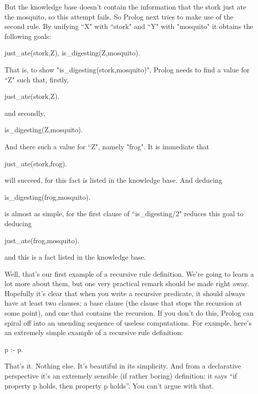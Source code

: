 But the knowledge base doesn't contain the information that the stork
just ate the mosquito, so this
attempt fails.  So Prolog next tries to make use of the second rule.
By unifying ``X" with ``stork" and ``Y" with
"mosquito" it obtains the following goals:
\begin{LPNcodedisplay}
just_ate(stork,Z),
is_digesting(Z,mosquito).
\end{LPNcodedisplay}
That is, to show
"is\_digesting(stork,mosquito)", Prolog
needs to find a value for ``Z" such that, firstly,
\begin{LPNcodedisplay}
just_ate(stork,Z).
\end{LPNcodedisplay}
and secondly,
\begin{LPNcodedisplay}
is_digesting(Z,mosquito).
\end{LPNcodedisplay}
And there  such a value for ``Z", namely
"frog".  It is immediate that
\begin{LPNcodedisplay}
just_ate(stork,frog).
\end{LPNcodedisplay}
will succeed, for this fact is listed in the knowledge base.  And deducing
\begin{LPNcodedisplay}
is_digesting(frog,mosquito).
\end{LPNcodedisplay}
is almost as simple, for the first clause of ``is\_digesting/2"
reduces this goal to deducing
\begin{LPNcodedisplay}
just_ate(frog,mosquito).
\end{LPNcodedisplay}
and this is a fact listed in the knowledge base.

Well, that's our first example of a recursive rule definition.  We're
going to learn a lot more about them, but one very practical remark
should be made right away.  Hopefully it's clear that when you write a
recursive predicate, it should always have at least two clauses: a
base clause (the clause that stops the recursion at some point), and
one that contains the recursion.  If you don't do this, Prolog can
spiral off into an unending sequence of useless computations.  For
example, here's an extremely simple example of a recursive rule
definition:
\begin{LPNcodedisplay}
p :- p.
\end{LPNcodedisplay}
That's it.  Nothing else.  It's beautiful in its simplicity.  And from
a declarative perspective it's an extremely sensible (if rather
boring) definition: it says ``if property p holds, then property
p holds''. You can't argue with that.

